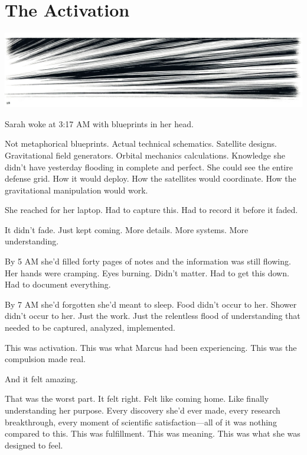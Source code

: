 \chapter{The Activation}
\label{ch:22}



\begin{center}
\includegraphics[width=\textwidth]{images/chapterImages/genesis_sketch_00119_.png}
\end{center}

Sarah woke at 3:17 AM with blueprints in her head.

Not metaphorical blueprints. Actual technical schematics. Satellite designs. Gravitational field generators. Orbital mechanics calculations. Knowledge she didn't have yesterday flooding in complete and perfect. She could see the entire defense grid. How it would deploy. How the satellites would coordinate. How the gravitational manipulation would work.

She reached for her laptop. Had to capture this. Had to record it before it faded.

It didn't fade. Just kept coming. More details. More systems. More understanding.

By 5 AM she'd filled forty pages of notes and the information was still flowing. Her hands were cramping. Eyes burning. Didn't matter. Had to get this down. Had to document everything.

By 7 AM she'd forgotten she'd meant to sleep. Food didn't occur to her. Shower didn't occur to her. Just the work. Just the relentless flood of understanding that needed to be captured, analyzed, implemented.

This was activation. This was what Marcus had been experiencing. This was the compulsion made real.

And it felt amazing.

That was the worst part. It felt right. Felt like coming home. Like finally understanding her purpose. Every discovery she'd ever made, every research breakthrough, every moment of scientific satisfaction—all of it was nothing compared to this. This was fulfillment. This was meaning. This was what she was designed to feel.


